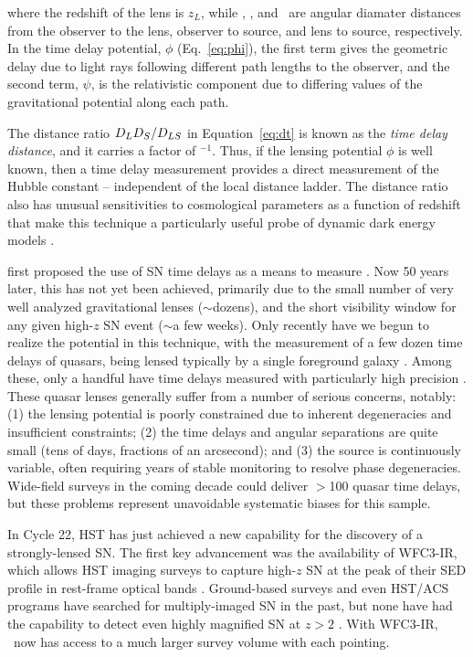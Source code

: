 \noindent where the redshift of the lens is $z_L$, while \Dl, \Ds, 
and \Dls\ are angular diamater distances from the observer to the
lens, observer to source, and lens to source, respectively.  In the time
delay potential, $\phi$ (Eq.~\ref{eq:phi}), the first term
gives the geometric delay due to light rays following different path
lengths to the observer, and the second term, $\psi$, is the
relativistic component due to differing values of the gravitational
potential along each path.

The distance ratio $D_LD_S/D_{LS}$ in Equation~\ref{eq:dt} is known as
the {\em time delay distance}, and it carries a factor
of \Ho$^{-1}$. Thus, if the lensing potential $\phi$ is well known,
then a time delay measurement provides a direct measurement of the
Hubble constant -- independent of the local distance ladder.  The
distance ratio also has unusual sensitivities to cosmological
parameters as a function of redshift that make this technique a
particularly useful probe of dynamic dark energy
models \citep{Linder:2011}.

\citet{Refsdal:1964} first proposed the use of SN time delays as 
a means to measure \Ho.  Now 50 years later, this has not yet been
achieved, primarily due to the small number of very well analyzed
gravitational lenses ($\sim$dozens), and the short visibility window
for any given high-$z$ SN event ($\sim$a few weeks).  Only recently
have we begun to realize the potential in this technique, with the
measurement of a few dozen time delays of quasars, being lensed
typically by a single foreground galaxy \citep{Jackson:2007}. Among
these, only a handful have time delays measured with particularly high
precision \citep[e.g.][]{Suyu:2010,Suyu:2013}.  These quasar lenses
generally suffer from a number of serious concerns, notably: (1) the
lensing potential is poorly constrained due to inherent degeneracies
and insufficient constraints; (2) the time delays and angular
separations are quite small (tens of days, fractions of an arcsecond);
and (3) the source is continuously variable, often requiring years of
stable monitoring to resolve phase degeneracies.  Wide-field surveys
in the coming decade could deliver $>$100 quasar time delays, but
these problems represent unavoidable systematic biases for this
sample.

\medskip
{}
 
In Cycle 22, HST has just achieved a new capability for the discovery
of a strongly-lensed SN. The first key advancement was the
availability of WFC3-IR, which allows HST imaging surveys to capture
high-$z$ SN at the peak of their SED profile in rest-frame optical
bands \citep{Rodney:2012,Jones:2013}.  Ground-based surveys and even
HST/ACS programs have searched for multiply-imaged SN in the past, but
none have had the capability to detect even highly magnified SN at
$z>2$ \citep[e.g.][]{Dawson:2009,Sand:2011}.  With WFC3-IR, \Hubble\
now has access to a much larger survey volume with each pointing.


